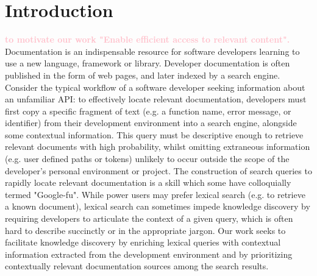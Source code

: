 \documentclass[sigconf,authordraft]{acmart}
\newcommand{\jg}[1]{\textbf{\textcolor{pink}{#1}}}
\begin{document}




\maketitle

\section{Introduction}
\jg{\cite{meng2019developers} to motivate our work "Enable efficient access to relevant content".}
Documentation is an indispensable resource for software developers learning to use a new language, framework or library. Developer documentation is often published in the form of web pages, and later indexed by a search engine. Consider the typical workflow of a software developer seeking information about an unfamiliar API: to effectively locate relevant documentation, developers must first copy a specific fragment of text (e.g. a function name, error message, or identifier) from their development environment into a search engine, alongside some contextual information. This query must be descriptive enough to retrieve relevant documents with high probability, whilst omitting extraneous information (e.g. user defined paths or tokens) unlikely to occur outside the scope of the developer's personal environment or project. The construction of search queries to rapidly locate relevant documentation is a skill which some have colloquially termed "Google-fu". While power users may prefer lexical search (e.g. to retrieve a known document), lexical search can sometimes impede knowledge discovery by requiring developers to articulate the context of a given query, which is often hard to describe succinctly or in the appropriate jargon. Our work seeks to facilitate knowledge discovery by enriching lexical queries with contextual information extracted from the development environment and by prioritizing contextually relevant documentation sources among the search results.
\end{document}
